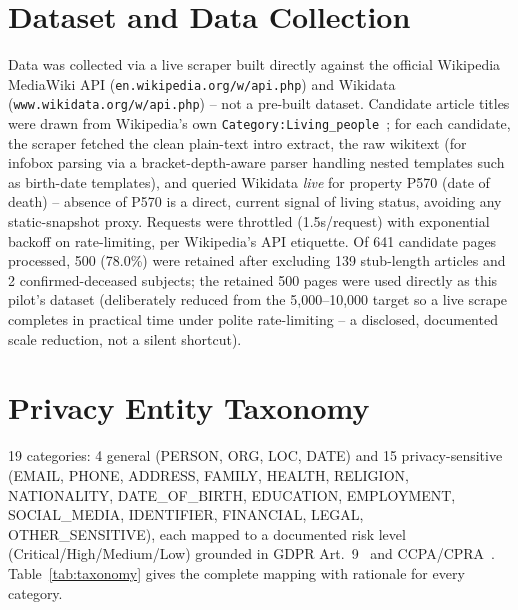 \documentclass[conference]{IEEEtran}
\begin{document}
\section{Dataset and Data Collection}
Data was collected via a live scraper built directly against the official Wikipedia MediaWiki API (\texttt{en.wikipedia.org/w/api.php}) and Wikidata (\texttt{www.wikidata.org/w/api.php}) -- not a pre-built dataset. Candidate article titles were drawn from Wikipedia's own \texttt{Category:Living\_people}~\cite{wikiproject2024}; for each candidate, the scraper fetched the clean plain-text intro extract, the raw wikitext (for infobox parsing via a bracket-depth-aware parser handling nested templates such as birth-date templates), and queried Wikidata \emph{live} for property P570 (date of death) -- absence of P570 is a direct, current signal of living status, avoiding any static-snapshot proxy. Requests were throttled (1.5s/request) with exponential backoff on rate-limiting, per Wikipedia's API etiquette. Of 641 candidate pages processed, 500 (78.0\%) were retained after excluding 139 stub-length articles and 2 confirmed-deceased subjects; the retained 500 pages were used directly as this pilot's dataset (deliberately reduced from the 5{,}000--10{,}000 target so a live scrape completes in practical time under polite rate-limiting -- a disclosed, documented scale reduction, not a silent shortcut).

\section{Privacy Entity Taxonomy}
19 categories: 4 general (PERSON, ORG, LOC, DATE) and 15 privacy-sensitive (EMAIL, PHONE, ADDRESS, FAMILY, HEALTH, RELIGION, NATIONALITY, DATE\_OF\_BIRTH, EDUCATION, EMPLOYMENT, SOCIAL\_MEDIA, IDENTIFIER, FINANCIAL, LEGAL, OTHER\_SENSITIVE), each mapped to a documented risk level (Critical/High/Medium/Low) grounded in GDPR Art.~9~\cite{gdpr2016} and CCPA/CPRA~\cite{ccpa2020}. Table~\ref{tab:taxonomy} gives the complete mapping with rationale for every category.
\end{document}
